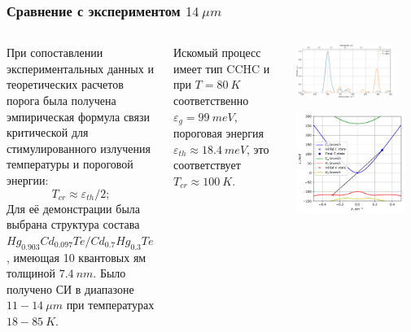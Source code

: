 \documentclass[9pt,pdf]{beamer}
\begin{document}
  \begin{frame}
    \frametitle{Сравнение с экспериментом $14~\mu m$}
    
    \begin{columns}
        При сопоставлении экспериментальных данных и теоретических расчетов порога была получена
        эмпирическая формула 
        связи критической для стимулированного излучения температуры и пороговой энергии: 
        \begin{equation*}
          T_{cr} \approx \varepsilon_{th} / 2;
        \end{equation*}
        Для её демонстрации была выбрана структура состава 
        $Hg_{0.903} Cd_{0.097}Te/Cd_{0.7} Hg_{0.3} Te$, имеющая 10 квантовых ям
        толщиной $7.4~nm$. 
        Было получено СИ в диапазоне $11-14~\mu m$ при температурах $18-85~K$. 
 
        Искомый процесс имеет тип CCHC и при $T=80~K$ соответственно
        $\varepsilon_g = 99~meV$, пороговая энергия $\varepsilon_{th} \approx 18.4~meV$, это соответствует 
        $T_{cr} \approx 100~K$.

        \begin{center}
          \includegraphics[width=0.8\textwidth]{./images/new_14um_spectre.pdf}
          
          \includegraphics[width=0.9\textwidth]{./images/14u_impure_80K.pdf}
        \end{center}
    \end{columns}
  \end{frame}
\end{document}

